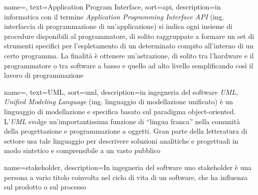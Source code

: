 
\renewcommand{\acronymname}{Acronimi e abbreviazioni}


    
	

\renewcommand{\glossaryname}{Glossario}

{
    name=,
    text=Application Program Interface,
    sort=api,
    description={in informatica con il termine \emph{Application Programming Interface API} (ing. interfaccia di programmazione di un'applicazione) si indica ogni insieme di procedure disponibili al programmatore, di solito raggruppate a formare un set di strumenti specifici per l'espletamento di un determinato compito all'interno di un certo programma. La finalità è ottenere un'astrazione, di solito tra l'hardware e il programmatore o tra software a basso e quello ad alto livello semplificando così il lavoro di programmazione}
}

{
    name=,
    text=UML,
    sort=uml,
    description={in ingegneria del software \emph{UML, Unified Modeling Language} (ing. linguaggio di modellazione unificato) è un linguaggio di modellazione e specifica basato sul paradigma object-oriented. L'\emph{UML} svolge un'importantissima funzione di ``lingua franca'' nella comunità della progettazione e programmazione a oggetti. Gran parte della letteratura di settore usa tale linguaggio per descrivere soluzioni analitiche e progettuali in modo sintetico e comprensibile a un vasto pubblico}
}

{
	name={stakeholder},
	description={In ingegneria del software uno stakeholder è una persona a vario titolo coinvolta nel ciclo di vita di un software, che ha influenza sul prodotto o sul processo}
}


